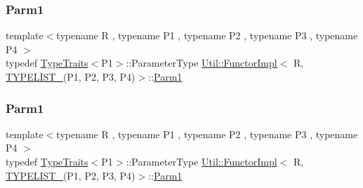 \subsubsection{\texorpdfstring{Parm1}{Parm1}\hspace{0.1cm}{\footnotesize\ttfamily [1/2]}}
{\footnotesize\ttfamily template$<$typename R , typename P1 , typename P2 , typename P3 , typename P4 $>$ \\
typedef \mbox{\hyperlink{classUtil_1_1TypeTraits}{Type\+Traits}}$<$P1$>$\+::Parameter\+Type \mbox{\hyperlink{classUtil_1_1FunctorImpl}{Util\+::\+Functor\+Impl}}$<$ R, \mbox{\hyperlink{install_2include_2adat_2typelist_8h_a7a156c571ab21a16b0495e1c882a07fa}{T\+Y\+P\+E\+L\+I\+S\+T\+\_}}(P1, P2, P3, P4)$>$\+::\mbox{\hyperlink{structUtil_1_1Private_1_1FunctorImplBase_a9d61e693d6c616dea5bd9d9073c7d21a}{Parm1}}}

\mbox{\label{classUtil_1_1FunctorImpl_3_01R_00_01TYPELIST__4_07P1_00_01P2_00_01P3_00_01P4_08_4_ab22bf7d6b59a883bb4a582f3a8ceaccc}} 
\subsubsection{\texorpdfstring{Parm1}{Parm1}\hspace{0.1cm}{\footnotesize\ttfamily [2/2]}}
{\footnotesize\ttfamily template$<$typename R , typename P1 , typename P2 , typename P3 , typename P4 $>$ \\
typedef \mbox{\hyperlink{classUtil_1_1TypeTraits}{Type\+Traits}}$<$P1$>$\+::Parameter\+Type \mbox{\hyperlink{classUtil_1_1FunctorImpl}{Util\+::\+Functor\+Impl}}$<$ R, \mbox{\hyperlink{install_2include_2adat_2typelist_8h_a7a156c571ab21a16b0495e1c882a07fa}{T\+Y\+P\+E\+L\+I\+S\+T\+\_}}(P1, P2, P3, P4)$>$\+::\mbox{\hyperlink{structUtil_1_1Private_1_1FunctorImplBase_a9d61e693d6c616dea5bd9d9073c7d21a}{Parm1}}}

\mbox{\label{classUtil_1_1FunctorImpl_3_01R_00_01TYPELIST__4_07P1_00_01P2_00_01P3_00_01P4_08_4_aaf289567dfbd9f3379db79d06f02f4a7}} 
